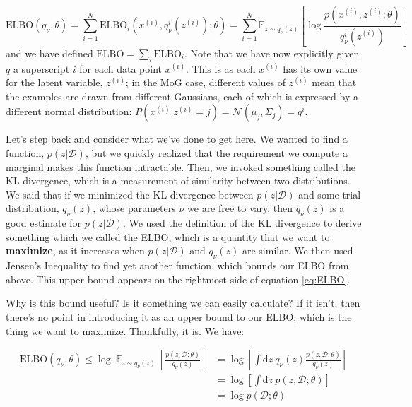 \documentclass[]{article}
\begin{document}
\begin{equation}\label{eq:ELBO_i}
    \text{ELBO}(q_\nu, \theta) 
    = 
    \sum_{i=1}^N \text{ELBO}_i(x^{(i)}, q^i_\nu(z^{(i)});\theta)
    =
    \sum_{i=1}^N\mathbb{E}_{z \sim q_\nu (z)}\left[\log\frac{p(x^{(i)}, z^{(i)};\theta)}{q^i_\nu (z^{(i)})}\right] 
\end{equation}
and we have defined $\text{ELBO} = \sum_i \text{ELBO}_i$. Note that we have now explicitly given $q$ a superscript $i$ for each data point $x^{(i)}$. This is as each $x^{(i)}$ has its own value for the latent variable, $z^{(i)}$; in the MoG case, different values of $z^{(i)}$ mean that the examples are drawn from different Gaussians, each of which is expressed by a different normal distribution: $P(x^{(i)} | z^{(i)}=j) = \mathcal{N}(\mu_j, \Sigma_j) = q^{i}$.

Let's step back and consider what we've done to get here. We wanted to find a function, $p(z|\mathcal{D})$, but we quickly realized that the requirement we compute a marginal makes this function intractable. Then, we invoked something called the KL divergence, which is a measurement of similarity between two distributions. We said that if we minimized the KL divergence between $p(z|\mathcal{{D}})$ and some trial distribution, $q_\nu (z)$, whose parameters $\nu$ we are free to vary, then $q_\nu (z)$ is a good estimate for $p(z|\mathcal{D})$. We used the definition of the KL divergence to derive something which we called the ELBO, which is a quantity that we want to \textbf{maximize}, as it increases when $p(z|\mathcal{D})$ and $q_\nu (z)$ are similar. We then used Jensen's Inequality to find yet another function, which bounds our ELBO from above. This upper bound appears on the rightmost side of equation \ref{eq:ELBO}.

Why is this bound useful? Is it something we can easily calculate? If it isn't, then there's no point in introducing it as an upper bound to our ELBO, which is the thing we want to maximize. Thankfully, it is. We have:

\begin{align}
    \text{ELBO}(q_\nu, \theta) \leq \log~\mathbb{E}_{z \sim q_\nu (z)}~\left[\frac{p(z, \mathcal{D};\theta)}{q_\nu (z)}\right] &= \log \left[ \int \text{d}z~q_\nu (z) \frac{p(z, \mathcal{D};\theta)}{q_\nu (z)} \right] 
    \\
    &= \log \left[ \int \text{d}z~p(z, \mathcal{D};\theta)\right] 
    \\
    &= \log p(\mathcal{D};\theta)
\end{align}
\end{document}
